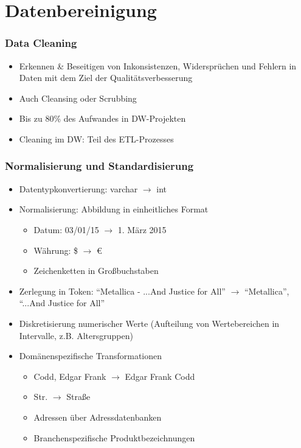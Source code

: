     
    
    \section{Datenbereinigung}
    
    
    
    
    \begin{frame}
    \frametitle{Data Cleaning}
    
    \begin{itemize}
    \item Erkennen \& Beseitigen von Inkonsistenzen, Widersprüchen und
      Fehlern in Daten mit dem Ziel der Qualitätsverbesserung  
    \item Auch Cleansing oder Scrubbing
    \item Bis zu 80\% des Aufwandes in DW-Projekten
    \item Cleaning im DW: Teil des ETL-Prozesses
    \end{itemize}
    
    \end{frame}
    
    
    \begin{frame}
    \frametitle{Normalisierung und Standardisierung}
    
    \begin{itemize}
    \item Datentypkonvertierung: varchar $\rightarrow$ int
    \item Normalisierung: Abbildung in einheitliches Format
    \begin{itemize}
    \item Datum: 03/01/15 $\rightarrow$ 1. März 2015
    \item Währung: \$ $\rightarrow$ \euro
    \item Zeichenketten in Großbuchstaben
    \end{itemize}
    \item Zerlegung in Token: ``Metallica - ...And Justice for All'' $\rightarrow$ ``Metallica'', ``...And Justice for All''
    \item Diskretisierung numerischer Werte (Aufteilung von Wertebereichen in Intervalle, z.B. Altersgruppen)
    \item Domänenspezifische Transformationen
    \begin{itemize}
    \item Codd, Edgar Frank $\rightarrow$ Edgar Frank Codd
    \item Str. $\rightarrow$ Straße
    \item Adressen über Adressdatenbanken
    \item Branchenspezifische Produktbezeichnungen
    \end{itemize}
    \end{itemize}
    
    \end{frame}
    
